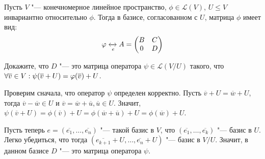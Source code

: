 \begin{exercise}
	Пусть $V$ "--- конечномерное линейное пространство, $\phi \in \mathcal{L}(V)$, $U \le V$ инвариантно относительно $\phi$. Тогда в базисе, согласованном с $U$, матрица $\phi$ имеет вид:
	\[\phi \xleftrightarrow[e]{} A = \begin{pmatrix}B & C \\ 0 & D\end{pmatrix}\]
	
	Докажите, что $D$ "--- это матрица оператора $\psi \in \mathcal{L}(V / U)$ такого, что $\forall \overline{v} \in V: \psi(\overline{v} \hm+ U) = \phi(\overline{v}) + U$.
\end{exercise}

\begin{solution}
	Проверим сначала, что оператор $\psi$ определен корректно. Пусть $\overline{v} + U = \overline{w} + U$, тогда $\overline{v} - \overline{w} \in U$ и $\overline{v} = \overline{w} + \overline{u}, \overline{u} \in U$. Значит, $\psi(\overline{v} + U) = \phi(\overline{v}) + U = \phi(\overline{w} + \overline{u}) + U = \phi(\overline{w}) + U$.
	
	Пусть теперь $e = (\overline{e_1}, \dotsc, \overline{e_n})$ "--- такой базис в $V$, что $(\overline{e_1}, \dotsc, \overline{e_k})$ "--- базис в $U$. Легко убедиться, что тогда $(\overline{e_{k+1}} + U, \dotsc, \overline{e_n} + U)$ "--- базис в $V / U$. Значит, в данном базисе $D$ "--- это матрица оператора $\psi$.
\end{solution}